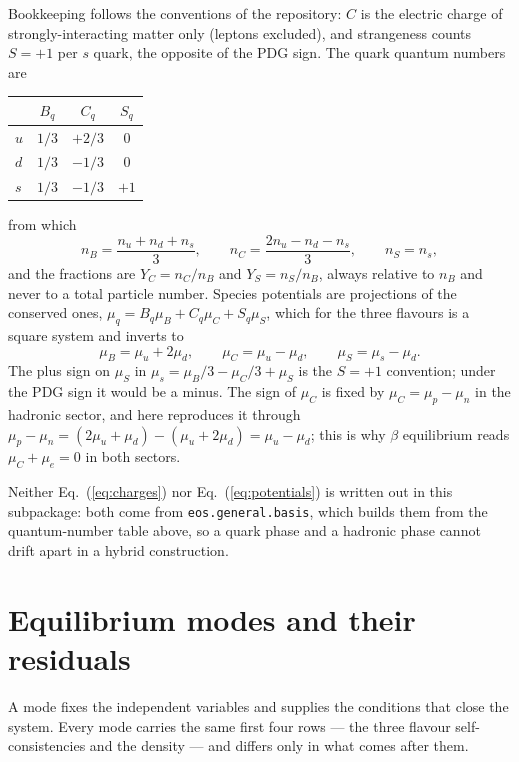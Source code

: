 \documentclass[aps,prc,onecolumn,superscriptaddress,nofootinbib,10pt]{revtex4-2}
\newcommand{\nB}{n_B}
\newcommand{\nC}{n_C}
\newcommand{\nS}{n_S}
\newcommand{\muB}{\mu_B}
\newcommand{\muC}{\mu_C}
\newcommand{\muS}{\mu_S}
\begin{document}
Bookkeeping follows the conventions of the repository: $C$ is the electric
charge of strongly-interacting matter only (leptons excluded), and strangeness
counts $S = +1$ per $s$ quark, the opposite of the PDG sign. The quark quantum
numbers are
%
\begin{center}
\begin{tabular}{lccc}
\toprule
 & $B_q$ & $C_q$ & $S_q$ \\
\midrule
$u$ & $1/3$ & $+2/3$ & $0$ \\
$d$ & $1/3$ & $-1/3$ & $0$ \\
$s$ & $1/3$ & $-1/3$ & $+1$ \\
\bottomrule
\end{tabular}
\end{center}
%
from which
%
\begin{equation}
\nB = \frac{n_u + n_d + n_s}{3} , \qquad
\nC = \frac{2 n_u - n_d - n_s}{3} , \qquad
\nS = n_s ,
\label{eq:charges}
\end{equation}
%
and the fractions are $Y_C = \nC/\nB$ and $Y_S = \nS/\nB$, always relative to
$\nB$ and never to a total particle number. Species potentials are projections
of the conserved ones, $\mu_q = B_q \muB + C_q \muC + S_q \muS$, which for the
three flavours is a square system and inverts to
%
\begin{equation}
\muB = \mu_u + 2\mu_d , \qquad
\muC = \mu_u - \mu_d , \qquad
\muS = \mu_s - \mu_d .
\label{eq:potentials}
\end{equation}
%
The plus sign on $\muS$ in $\mu_s = \muB/3 - \muC/3 + \muS$ is the $S = +1$
convention; under the PDG sign it would be a minus. The sign of $\muC$ is
fixed by $\muC = \mu_p - \mu_n$ in the hadronic sector, and here reproduces it
through $\mu_p - \mu_n = (2\mu_u + \mu_d) - (\mu_u + 2\mu_d) = \mu_u - \mu_d$;
this is why $\beta$ equilibrium reads $\muC + \mu_e = 0$ in both sectors.

Neither Eq.~(\ref{eq:charges}) nor Eq.~(\ref{eq:potentials}) is written out in
this subpackage: both come from \texttt{eos.general.basis}, which builds them
from the quantum-number table above, so a quark phase and a hadronic phase
cannot drift apart in a hybrid construction.

\section{Equilibrium modes and their residuals}
\label{sec:modes}

A mode fixes the independent variables and supplies the conditions that close
the system. Every mode carries the same first four rows --- the three
flavour self-consistencies and the density --- and differs only in what comes
after them.
\end{document}
